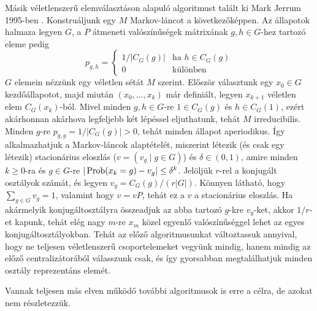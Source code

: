 Másik véletlenszerű elemválasztáson alapuló algoritmust talált ki Mark Jerrum 1995-ben \cite{Jer95}.
Konstruáljunk egy $M$ Markov-láncot a következőképpen.
Az állapotok halmaza legyen $G$, a $P$ átmeneti valószínűségek mátrixának $g, h \in G$-hez tartozó eleme pedig
\begin{equation*}
p_{g,h} =
\begin{cases}
1/|C_G(g)| & \text{ha $h \in C_G(g)$}\\
0 & \text{különben}
\end{cases}
\end{equation*}
$G$ elemein nézzünk egy véletlen sétát $M$ szerint. Először választunk egy $x_0 \in G$ kezdőállapotot, majd miután $(x_0, \dots, x_k)$ már definiált, legyen
$x_{k+1}$ véletlen elem $C_G(x_k)$-ból.
Mivel minden $g,h \in G$-re $1 \in C_G(g)$ és $h \in C_G(1)$, ezért akárhonnan akárhova legfeljebb két lépéssel eljuthatunk, tehát $M$ irreducibilis.
Minden $g$-re $p_{g,g} = 1/|C_G(g)| > 0$, tehát minden állapot aperiodikus.
Így alkalmazhatjuk a Markov-láncok alaptételét, miszerint létezik (és csak egy létezik) stacionárius eloszlás ($v = (v_g \mid g \in G)$) és $\delta \in (0,1)$, amire
minden $k \ge 0$-ra és $g \in G$-re $|\operatorname{Prob}(x_k = g) - v_g| \le \delta^k$.
Jelöljük $r$-rel a konjugált osztályok számát, és legyen $v_g = C_G(g)/(r|G|)$.
Könnyen látható, hogy $\sum_{g\in G} v_g = 1$, valamint hogy $v = vP$, tehát ez a $v$ a stacionárius eloszlás.
Ha akármelyik konjugáltosztályra összeadjuk az abba tartozó $g$-kre $v_g$-ket, akkor $1/r$-et kapunk, tehát elég nagy $m$-re $x_m$ közel egyenlő valószínűséggel lehet az egyes konjugáltosztályokban.
Tehát az előző algoritmusunkat változtassuk annyival, hogy ne teljesen véletlenszerű csoportelemeket vegyünk mindig, hanem mindig az előző centralizátorából válasszunk csak, és így gyorsabban megtalálhatjuk
minden osztály reprezentáns elemét.

Vannak teljesen más elven működő további algoritmusok is erre a célra, de azokat nem részletezzük.